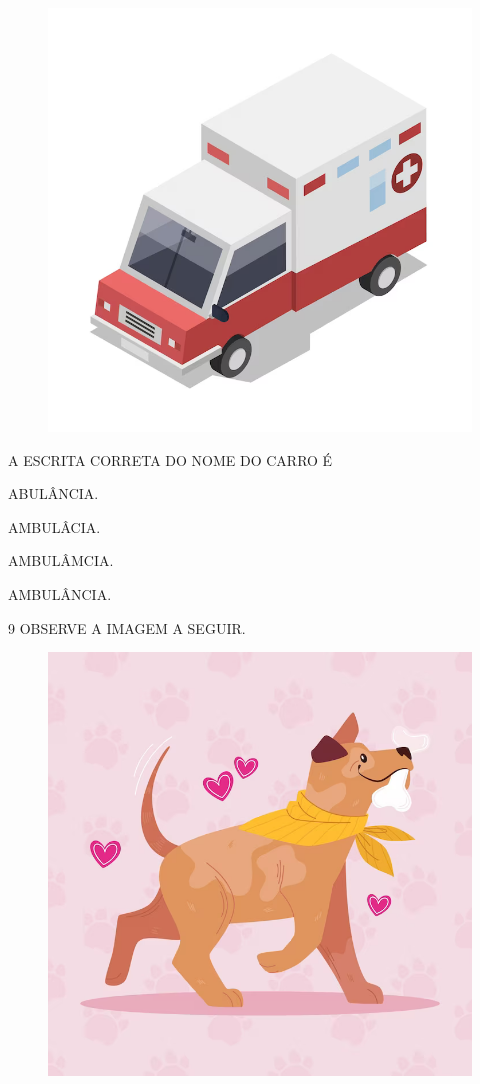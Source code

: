 \begin{figure}[H]
\centering
\includegraphics[width=\textwidth]{./media/image225.png}
\end{figure}

A ESCRITA CORRETA DO NOME DO CARRO É

\begin{escolha}

\item ABULÂNCIA.

\item AMBULÂCIA.

\item AMBULÂMCIA.

\item AMBULÂNCIA.

\end{escolha}

\pagebreak
\num{9} OBSERVE A IMAGEM A SEGUIR.

\begin{figure}[H]
\centering
\includegraphics[width=.5\textwidth]{./media/image226.png}
\end{figure}

